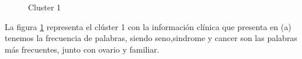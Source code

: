 \begin{figure}[H]
	\centering
	\caption{Cluster 1} \label{fig:c1}
\end{figure}




La figura \ref{fig:c1} representa el clúster 1 con la información clínica que presenta en (a) tenemos la frecuencia de palabras, siendo seno,sindrome y cancer son las palabras más frecuentes, junto con ovario y familiar.


